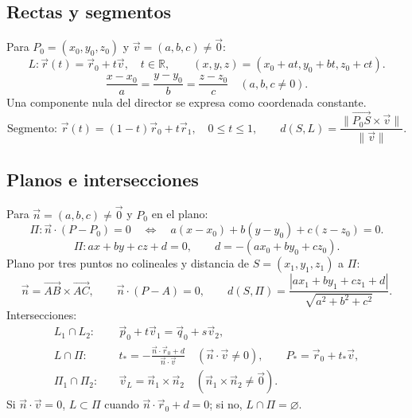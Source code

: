 \subsection*{Rectas y segmentos}
Para $P_0=(x_0,y_0,z_0)$ y $\vec v=(a,b,c)\ne\vec0$:
\[
L:\vec r(t)=\vec r_0+t\vec v,\quad t\in\mathbb R,
\qquad(x,y,z)=(x_0+at,y_0+bt,z_0+ct).
\]
\[
\frac{x-x_0}{a}=\frac{y-y_0}{b}=\frac{z-z_0}{c}\quad(a,b,c\ne0).
\]
Una componente nula del director se expresa como coordenada constante.
\[
\text{Segmento: }\vec r(t)=(1-t)\vec r_0+t\vec r_1,\quad 0\leq t\leq1,
\qquad
d(S,L)=\frac{\|\overrightarrow{P_0S}\times\vec v\|}{\|\vec v\|}.
\]

\newpage
\subsection*{Planos e intersecciones}
Para $\vec n=(a,b,c)\ne\vec0$ y $P_0$ en el plano:
\[
\Pi:\vec n\cdot(P-P_0)=0
\quad\Longleftrightarrow\quad
a(x-x_0)+b(y-y_0)+c(z-z_0)=0.
\]
\[
\Pi:ax+by+cz+d=0,\qquad d=-(ax_0+by_0+cz_0).
\]
Plano por tres puntos no colineales y distancia de $S=(x_1,y_1,z_1)$ a $\Pi$:
\[
\vec n=\overrightarrow{AB}\times\overrightarrow{AC},\qquad
\vec n\cdot(P-A)=0,\qquad
d(S,\Pi)=\frac{|ax_1+by_1+cz_1+d|}{\sqrt{a^2+b^2+c^2}}.
\]
Intersecciones:
\begin{align*}
L_1\cap L_2:&\quad \vec p_0+t\vec v_1=\vec q_0+s\vec v_2,\\
L\cap\Pi:&\quad t_*=-\frac{\vec n\cdot\vec r_0+d}{\vec n\cdot\vec v}
\quad(\vec n\cdot\vec v\ne0),\qquad P_*=\vec r_0+t_*\vec v,\\
\Pi_1\cap\Pi_2:&\quad \vec v_L=\vec n_1\times\vec n_2
\quad(\vec n_1\times\vec n_2\ne\vec0).
\end{align*}
Si $\vec n\cdot\vec v=0$, $L\subset\Pi$ cuando $\vec n\cdot\vec r_0+d=0$;
si no, $L\cap\Pi=\varnothing$.

